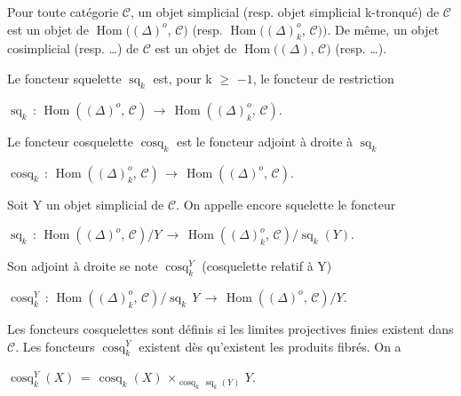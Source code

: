 \documentclass[11pt,twoside]{article}
\newcommand{\DFormula}[1]{%
  \par\smallskip\noindent\hspace*{0pt}\(\displaystyle #1\)\par\smallskip
}
\begin{document}
Pour toute catégorie \(\mathcal{C}\), un objet simplicial (resp. objet simplicial k-tronqué) de \(\mathcal{C}\) est un objet de \(\operatorname{Hom}((\Delta )^{o}\), \(\mathcal{C})\) (resp. \(\operatorname{Hom}((\Delta )_{k}^{o}\), \(\mathcal{C}))\). De même, un objet cosimplicial (resp. …) de \(\mathcal{C}\) est un objet de \(\operatorname{Hom}((\Delta )\), \(\mathcal{C})\) (resp. …).\par
\par\medskip
Le foncteur squelette \(\operatorname{sq}_{k}\) est, pour k \(\geq \) \(−1\), le foncteur de restriction\par
\par\medskip
\DFormula{\operatorname{sq}_{k}\,:\,\operatorname{Hom}((\Delta )^{o},\,\mathcal{C})\,\to \,\operatorname{Hom}((\Delta )_{k}^{o},\,\mathcal{C}).}
\par\medskip
Le foncteur cosquelette \(\operatorname{cosq}_{k}\) est le foncteur adjoint à droite à \(\operatorname{sq}_{k}\)\par
\par\medskip
\DFormula{\operatorname{cosq}_{k}\,:\,\operatorname{Hom}((\Delta )_{k}^{o},\,\mathcal{C})\,\to \,\operatorname{Hom}((\Delta )^{o},\,\mathcal{C}).}
\par\medskip
Soit Y un objet simplicial de \(\mathcal{C}\). On appelle encore squelette le foncteur\par
\par\medskip
\DFormula{\operatorname{sq}_{k}\,:\,\operatorname{Hom}((\Delta )^{o},\,\mathcal{C})/Y\,\to \,\operatorname{Hom}((\Delta )_{k}^{o},\,\mathcal{C})/\operatorname{sq}_{k}(Y).}
\par\medskip
Son adjoint à droite se note \(\operatorname{cosq}_{k}^{Y}\) (cosquelette relatif à Y)\par
\par\medskip
\DFormula{\operatorname{cosq}_{k}^{Y}\,:\,\operatorname{Hom}((\Delta )_{k}^{o},\,\mathcal{C})/\operatorname{sq}_{k}\,Y\,\to \,\operatorname{Hom}((\Delta )^{o},\,\mathcal{C})/Y.}
\par\medskip
Les foncteurs cosquelettes sont définis si les limites projectives finies existent dans \(\mathcal{C}\). Les foncteurs \(\operatorname{cosq}_{k}^{Y}\) existent dès qu’existent les produits fibrés. On a\par
\par\medskip
\DFormula{\operatorname{cosq}_{k}^{Y}(X)\,=\,\operatorname{cosq}_{k}(X)\,\times _{\operatorname{cosq}_{k}\,\operatorname{sq}_{k}(Y)}\,Y.}
\par\medskip
\end{document}
